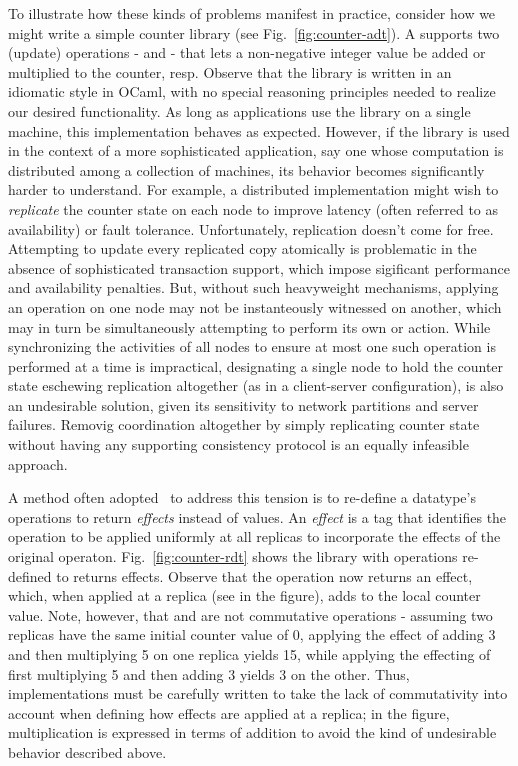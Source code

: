To illustrate how these kinds of problems manifest in practice,
consider how we might write a simple counter library (see
Fig.~\ref{fig:counter-adt}).  A  supports two (update)
operations -  and  - that lets a non-negative integer
value be added or multiplied to the counter, resp.  Observe that the
library is written in an idiomatic style in OCaml, with no special
reasoning principles needed to realize our desired functionality.  As
long as applications use the library on a single machine, this
implementation behaves as expected.  However, if the library is used
in the context of a more sophisticated application, say one whose
computation is distributed among a collection of machines, its
behavior becomes significantly harder to understand.  For example, a
distributed implementation might wish to \emph{replicate} the counter
state on each node to improve latency (often referred to as
availability) or fault tolerance.  Unfortunately, replication doesn't
come for free.  Attempting to update every replicated copy atomically
is problematic in the absence of sophisticated transaction support,
which impose sigificant performance and availability penalties.  But,
without such heavyweight mechanisms, applying an  operation on
one node may not be instanteously witnessed on another, which may in
turn be simultaneously attempting to perform its own  or
 action.  While synchronizing the activities of all nodes to
ensure at most one such operation is performed at a time is
impractical, designating a single node to hold the counter state
eschewing replication altogether (as in a client-server
configuration), is also an undesirable solution, given its sensitivity
to network partitions and server failures.  Removig coordination
altogether by simply replicating counter state without having any
supporting consistency protocol is an equally infeasible approach.

A method often adopted~\cite{SPB+11,Burckhardt2014} to address
this tension is to re-define a datatype's operations to return
\emph{effects} instead of values.  An \emph{effect} is a tag that
identifies the operation to be applied uniformly at all replicas to
incorporate the effects of the original
operaton. Fig.~\ref{fig:counter-rdt} shows the  library
with operations re-defined to returns effects.  Observe that the
 operation now returns an  effect, which,
when applied at a replica (see  in the figure), adds  to
the local counter value.  Note, however, that  and  are
not commutative operations - assuming two replicas have the same
initial counter value of 0, applying the effect of adding 3 and then
multiplying 5 on one replica yields 15, while applying the effecting
of first multiplying 5 and then adding 3 yields 3 on the other.  Thus,
implementations must be carefully written to take the lack of
commutativity into account when defining how effects are applied at a
replica; in the figure, multiplication is expressed in terms of
addition to avoid the kind of undesirable behavior described above.

